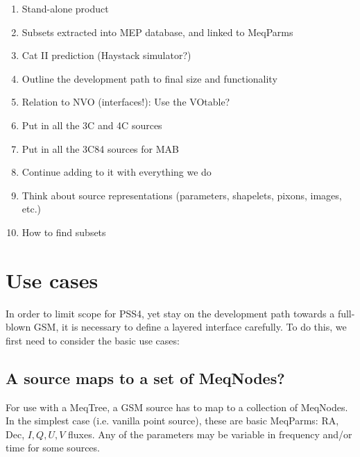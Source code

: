 \documentclass[]{lofar}
\begin{document}
  \begin{enumerate}
  
  \item Stand-alone product
  
  \item Subsets extracted into MEP database, and linked to MeqParms
  
  \item Cat II prediction (Haystack simulator?)
  
  \item Outline the development path to final size and functionality
  
  \item Relation to NVO (interfaces!): Use the VOtable?
  
  \item Put in all the 3C and 4C sources
  
  \item Put in all the 3C84 sources for MAB
  
  \item Continue adding to it with everything we do
  
  \item Think about source representations (parameters, shapelets, pixons, images, etc.)
  
  \item How to find subsets
  
  \end{enumerate}
  
\section{Use cases}
  
  In order to limit scope for PSS4, yet stay on the development path towards a
  full-blown GSM, it is necessary to define a layered interface carefully. To
  do this, we first need to consider the basic use cases:

\subsection{A source maps to a set of MeqNodes?} 
  
  For use with a MeqTree, a GSM source has to map to a collection of MeqNodes.
  In the simplest case (i.e. vanilla point source), these are basic MeqParms:
  RA, Dec, $I,Q,U,V$ fluxes. Any of the parameters may be variable in frequency
  and/or time for some sources.
\end{document}

